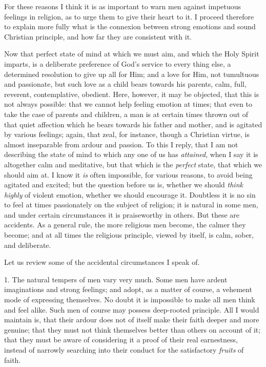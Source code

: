For these reasons I think it is as important to warn
men against impetuous feelings in religion, as to urge
them to give their heart to it. I proceed therefore to
explain more fully what is the connexion between strong
emotions and sound Christian principle, and how far they
are consistent with it.

Now that perfect state of mind at which we must aim,
and which the Holy Spirit imparts, is a deliberate
preference of God's service to every thing else, a
determined resolution to give up all for Him; and a love
for Him, not tumultuous and passionate, but such love as
a child bears towards his parents, calm, full, reverent,
contemplative, obedient. Here, however, it may be
objected, that this is not always possible: that we cannot help feeling emotion at times; that even to take
the case of parents and children, a man is at certain
times thrown out of that quiet affection which he bears
towards his father and mother, and is agitated by various
feelings; again, that zeal, for instance, though a
Christian virtue, is almost inseparable from ardour and
passion. To this I reply, that I am not describing the
state of mind to which any one of us has \emph{attained},
when I say it is altogether calm and meditative, but that
which is the \emph{perfect} state, that which we should
aim at. I know it \emph{is} often impossible, for
various reasons, to avoid being agitated and excited; but
the question before us is, whether we should \emph{think
highly} of violent emotion, whether we should
encourage it. Doubtless it is no sin to feel at times
passionately on the subject of religion; it is natural in
some men, and under certain circumstances it is
praiseworthy in others. But these are accidents. As a
general rule, the more religious men become, the calmer
they become; and at all times the religious principle,
viewed by itself, is calm, sober, and deliberate.

Let us review some of the accidental circumstances I
speak of.

1. The natural tempers of men vary very much. Some men
have ardent imaginations and strong feelings; and adopt,
as a matter of course, a vehement mode of expressing
themselves. No doubt it is impossible to make all men
think and feel alike. Such men of course may possess
deep-rooted principle. All I would maintain is, that
their ardour does not of itself make their faith deeper
and more genuine; that they must not think themselves
better than others on account of it; that they must be
aware of considering it a proof of their real
earnestness, instead of narrowly searching into their
conduct for the satisfactory \emph{fruits} of faith.

